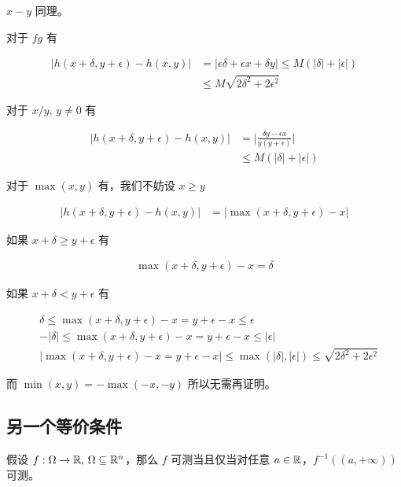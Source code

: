 $x-y$ 同理。

对于 $fg$ 有

\begin{align*}
\lvert h(x+\delta, y+\epsilon) - h(x,y) \rvert &= \lvert \epsilon\delta + \epsilon x  + \delta y\rvert \le M(\lvert \delta \rvert + \lvert \epsilon \rvert) \\
& \le M\sqrt{2\delta^2 + 2\epsilon^2}
\end{align*}


对于 $x/y,\, y \ne 0$ 有

\begin{align*}
\lvert h(x+\delta, y+\epsilon) - h(x,y) \rvert &= \lvert \frac{\delta y - \epsilon x }{y(y+\epsilon)}\rvert  \\
& \le M(\lvert \delta \rvert + \lvert \epsilon \rvert)
\end{align*}

对于 $\max(x,y)$ 有，我们不妨设 $x \ge y$

\begin{align*}
\lvert h(x+\delta, y+\epsilon) - h(x,y) \rvert &= \lvert \max(x+\delta, y+\epsilon) - x\rvert 
\end{align*}

如果 $x+\delta \ge y + \epsilon$ 有


\begin{align*}
\max(x+\delta, y+\epsilon) - x = \delta
\end{align*}

如果 $x+\delta < y + \epsilon$ 有

\begin{align*}
&\delta \le \max(x+\delta, y+\epsilon) - x = y + \epsilon - x \le \epsilon \\
& - \lvert \delta \rvert \le \max(x+\delta, y+\epsilon) - x = y + \epsilon - x \le \lvert \epsilon \rvert \\
& \lvert\max(x+\delta, y+\epsilon) - x = y + \epsilon - x \rvert \le \max(\lvert \delta \rvert, \lvert \epsilon \rvert) \le \sqrt{2\delta^2 + 2\epsilon^2}
\end{align*}


而 $\min(x,y) = - \max(-x, -y)$ 所以无需再证明。

\subsection{另一个等价条件}

假设 $f: \Omega \to \mathbb{R},\, \Omega \subseteq \mathbb{R}^n$，那么 $f$ 可测当且仅当对任意 $a \in \mathbb{R}$，$f^{-1}((a, +\infty))$ 可测。

